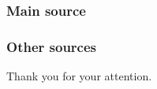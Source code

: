 \nocite{*}

\begin{frame}
	\frametitle{Main source}
%	
%	
	\printbibliography[title={Main source},keyword={main}]
\end{frame}

\begin{frame}[allowframebreaks]
	\frametitle{Other sources}
	\printbibliography[keyword={secondary}, title={Other sources}]
\end{frame}

\begin{frame}[plain]
	\begin{center}
		\Large{{Thank you for your attention.}}
	\end{center}
\end{frame}



